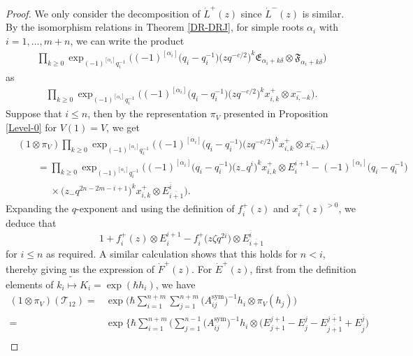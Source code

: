 \documentclass[pdftex]{sigma}
\numberwithin{equation}{section}
\begin{document}
\begin{proof} We only consider the decomposition of $\dot{L}^+(z)$ since $\dot{L}^-(z)$ is similar.
By the isomorphism relations in Theorem \ref{DR-DRJ}, for simple roots $\alpha_i$ with $i=1,\dots,m+n$, we can write the product
\begin{align*}
\prod\limits_{k\geq0 }\exp_{(-1)^{[\alpha_i]}q_{i}^{-1}}\bigl((-1)^{[\alpha_i]}\bigl(q_{i}-q_{i}^{-1}\bigr)\bigl(zq^{-c/2}\bigr)^k\mathfrak{E}_{\alpha_i+k\delta}\otimes \mathfrak{F}_{\alpha_i+k\delta}\bigr)
\end{align*}as
\begin{align*}
\prod\limits_{k\geq0 }\exp_{(-1)^{[\alpha_i]}q_{i}^{-1}}\bigl((-1)^{[\alpha_i]}\bigl(q_{i}-q_{i}^{-1}\bigr)\bigl(zq^{-c/2}\bigr)^k x^{+}_{i,k}\otimes x^{-}_{i,-k}\bigr).
\end{align*}
Suppose that $i\leq n$, then by the representation $\pi_{V}$ presented in Proposition \ref{Level-0} for $V(1)=V$, we get
\begin{align*}
&(1\otimes\pi_V) \prod\limits_{k\geq0 }\exp_{(-1)^{[\alpha_i]}q_{i}^{-1}}\bigl((-1)^{[\alpha_i]}\bigl(q_{i}-q_{i}^{-1}\bigr)\bigl(zq^{-c/2}\bigr)^k x^{+}_{i,k}\otimes x^{-}_{i,-k}\bigr)\\
&\qquad=\prod\limits_{k\geq0 }\exp_{(-1)^{[\alpha_i]}q_{i}^{-1}}\bigl((-1)^{[\alpha_i]}\bigl(q_{i}-q_{i}^{-1}\bigr)\bigl(z_-q^{i}\bigr)^k x^{+}_{i,k}\otimes E^{i+1}_i-(-1)^{[\alpha_i]}\bigl(q_{i}-q_{i}^{-1}\bigr)\\
&\phantom{\qquad=}{}\times\bigl(z_-q^{2n-2m-i+1}\bigr)^k x^{+}_{i,k}\otimes E^{\overline{i}}_{\overline{i+1}}\bigr).
\end{align*}
Expanding the $q$-exponent and using the definition of $f_i^+(z)$ and $x_i^+(z)^{>0}$, we deduce that \[1+f_i^+(z)\otimes E^{i+1}_i-f_i^+\bigl(z\zeta q^{2i}\bigr)\otimes E^{\overline{i}}_{\overline{i+1}}\] for $i\leq n$ as required. A similar calculation shows that this holds for $n<i$, thereby giving us the expression of $\dot{F}^+(z)$.
For $\dot{E}^+(z)$, first from the definition elements of $k_i\tilde{\mapsto} K_i=\exp(\hbar h_i)$, we have
\begin{align*}
(1\otimes\pi_V)(\mathcal{T}_{12})={}&\exp\Biggl(\hbar\sum\limits_{i=1}^{n+m}\sum\limits_{j=1}^{n+m}\bigl(A_{ij}^{\operatorname{sym}}\bigr)^{-1}h_i\otimes\pi_V(h_j)\Biggr)\\
={}&\exp\Biggl\{\hbar\sum\limits_{i=1}^{n+m}\Biggl(\sum\limits_{j=1}^{n-1}\bigl(A_{ij}^{\operatorname{sym}}\bigr)^{-1}h_i\otimes
\bigl(E^{j+1}_{j+1}-E^{j}_{j}-E^{\overline{j+1}}_{\overline{j+1}}+E^{\overline{j}}_{\overline{j}}\bigr)\\

\end{align*}
\end{proof}
\end{document}

